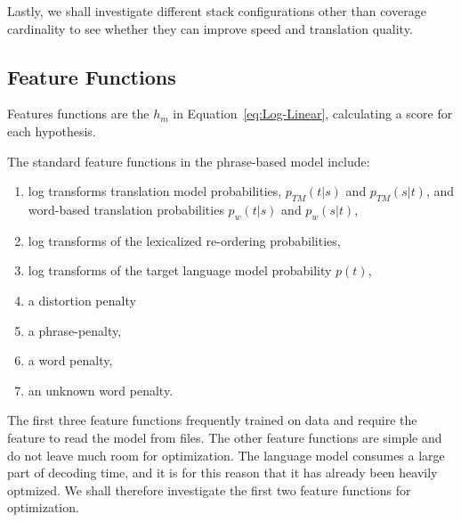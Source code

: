\documentclass[11pt]{article}
\begin{document}
Lastly, we shall investigate different stack configurations other than coverage cardinality to see whether they can improve speed and translation quality.

\subsection{Feature Functions}

Features functions are the $h_m$ in Equation~\ref{eq:Log-Linear}, calculating a score for each hypothesis.

The standard feature functions in the phrase-based model include:
\begin{enumerate}
  \item \vspace{-2 mm} log transforms translation model probabilities, $p_{TM}(t|s) $ and $p_{TM}(s|t)$, and word-based translation probabilities $p_w(t|s)$ and $p_w(s|t)$,
  \item \vspace{-2 mm} log transforms of the lexicalized re-ordering probabilities,
  \item \vspace{-2 mm} log transforms of the target language model probability $p(t)$, 
  \item \vspace{-2 mm} a distortion penalty
  \item \vspace{-2 mm} a phrase-penalty,
  \item \vspace{-2 mm} a word penalty,
  \item \vspace{-2 mm} an unknown word penalty.
\end{enumerate}

The first three feature functions frequently trained on data and require the feature to read the model from files. The other feature functions are simple and do not leave much room for optimization. The language model consumes a large part of decoding time, and it is for this reason that it has already been heavily optmized. We shall therefore investigate the first two feature functions for optimization.

%
\end{document}
